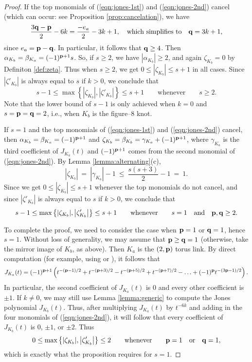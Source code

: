 \documentclass[11pt]{amsart}
\newcommand{\abs}[1]{{\left\vert #1 \right\vert}}
\newcommand{\p}{{\bf p}}
\newcommand{\q}{{\bf q}}
\theoremstyle{plain}
\theoremstyle{definition}
\begin{document}
\begin{proof}
If the top monomials of  (\ref{eqn:jones-1st}) and (\ref{eqn:jones-2nd}) cancel (which can occur: see Proposition \ref{prop:cancelation}), we have
$$\frac{3\q-\p}{2}-6k = \frac{-e_a}{2}-3k +1, \quad \mbox{which simplifies to} \quad
\q = 3k + 1,$$
since $e_a = \p - \q$. In particular, it follows that $\q \geq 4$. Then
 $\alpha_{K_b} = \beta_{K_a} = (-1)^{\p + 1}s$. So, if $s \geq 2$, we have $\abs{\alpha_{K_b}} \geq 2$, and again $\zeta_{K_b} = 0$ by Definiton \ref{def:zeta}. Thus when $s \geq 2$, we get $0 \leq \abs{\zeta_{K_b}} \leq s+1$ in all cases. Since $|\zeta'_{K_b}|$ is always equal to $s$ if $k>0$, we conclude that
$$s-1 \leq  \max \left\{ \abs{\zeta_{K_b}}, \abs{\zeta'_{K_b}} \right\} \leq s+1
\qquad \mbox{whenever} \qquad s \geq 2.$$
Note that the lower bound of $s-1$ is only achieved when $k = 0$ and $s = \p = \q = 2$, i.e., when $K_b$ is the figure--$8$ knot.

If $s = 1$ and the top monomials of  (\ref{eqn:jones-1st}) and (\ref{eqn:jones-2nd}) cancel, then $\alpha_{K_b} = \beta_{K_a} = (-1)^{\p + 1}$ and $\zeta_{K_b} = \beta_{K_b} = \gamma_{K_a} + (-1)^{\p+1}$,
where $\gamma_{K_a}$ is the third coefficient of $J_{K_a}(t)$ and $(-1)^{\p+1}$ comes from the second monomial of (\ref{eqn:jones-2nd}). By Lemma \ref{lemma:alternating}(c),
$$\abs{\zeta_{K_b}} \: = \: \abs{\gamma_{K_a}} - 1 \: \leq \: \frac{s(s+3)}{2} - 1\: = \: 1.$$
Since we get $0 \leq \abs{\zeta_{K_b}} \leq s+1$ whenever the top monomials do not cancel, and since $|\zeta'_{K_b}|$ is always equal to $s$ if $k>0$, we conclude that
$$s-1 \leq  \max \left\{ \abs{\zeta_{K_b}}, \abs{\zeta'_{K_b}} \right\} \leq s+1
\qquad \mbox{whenever} \qquad s = 1 \quad \mbox{and} \quad \p, \q \geq 2.$$

To complete the proof, we need to consider the case when $\p = 1$ or $\q = 1$, hence $s=1$. Without loss of generality, we may assume that $\p \geq \q = 1$ (otherwise, take the mirror image of $K_b$, as above). Then $K_a$ is the $(2,\p)$ torus link. By direct computation (for example, using \cite[Theorem 14.13]{lickbook} or \cite[Proposition 2.1 and Example 3]{ck:cyclotomic}), it follows that
$$J_{K_a}(t) = (-1)^{\p+1} \left( t^{-(\p-1)/2} + t^{-(\p+3)/2} - t^{-(\p+5)/2}  +  t^{-(\p+7)/2} - \ldots + (-1)^\p t^{-(3\p-1)/2} \right).$$
In particular, the second coefficient of $J_{K_a}(t)$ is $0$ and every other coefficient is $\pm 1$. If $k \neq 0$, we may still use Lemma \ref{lemma:generic} to compute the Jones polynomial $J_{K_b}(t)$. Thus, after multiplying $J_{K_a}(t)$ by $t^{-6k}$ and adding in the four monomials of (\ref{eqn:jones-2nd}), it will follow that every coefficient of $J_{K_b}(t)$ is $0$, $\pm 1$, or $\pm 2$. Thus
$$0 \leq  \max \left\{ \abs{\zeta_{K_b}}, \abs{\zeta'_{K_b}} \right\} \leq 2
\qquad \mbox{whenever} \qquad  \p = 1 \quad \mbox{or} \quad \q = 1,$$
which is exactly what the proposition requires for $s=1$.
\end{proof}
\end{document}
